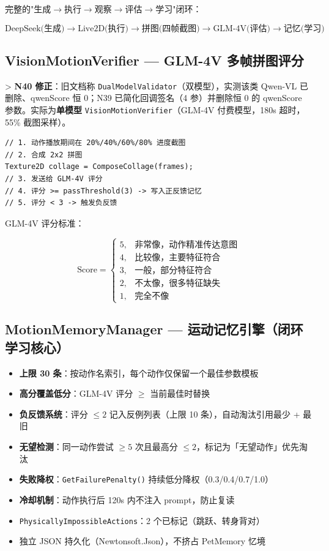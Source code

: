 \documentclass[12pt,a4paper]{ctexart}
\begin{document}
完整的"生成$\rightarrow$执行$\rightarrow$观察$\rightarrow$评估$\rightarrow$学习"闭环：

\[
\text{DeepSeek(生成)} \rightarrow \text{Live2D(执行)} \rightarrow \text{拼图(四帧截图)} \rightarrow \text{GLM-4V(评估)} \rightarrow \text{记忆(学习)}
\]

\subsection{VisionMotionVerifier --- GLM-4V 多帧拼图评分}

> \textbf{N40 修正}：旧文档称 \texttt{DualModelValidator}（双模型），实测该类 Qwen-VL 已删除、qwenScore 恒 0；N39 已简化回调签名（4 参）并删除恒 0 的 qwenScore 参数。实际为\textbf{单模型} \texttt{VisionMotionVerifier}（GLM-4V 付费模型，180s 超时，55\% 截图采样）。

\begin{lstlisting}[style=csharp,caption={多帧拼图验证核心},label={lst:collage}]
// 1. 动作播放期间在 20%/40%/60%/80% 进度截图
// 2. 合成 2x2 拼图
Texture2D collage = ComposeCollage(frames);
// 3. 发送给 GLM-4V 评分
// 4. 评分 >= passThreshold(3) -> 写入正反馈记忆
// 5. 评分 < 3 -> 触发负反馈
\end{lstlisting}

GLM-4V 评分标准：

\[
\text{Score} =
\begin{cases}
5, & \text{非常像，动作精准传达意图} \\
4, & \text{比较像，主要特征符合} \\
3, & \text{一般，部分特征符合} \\
2, & \text{不太像，很多特征缺失} \\
1, & \text{完全不像}
\end{cases}
\]

\subsection{MotionMemoryManager --- 运动记忆引擎（闭环学习核心）}

\begin{itemize}
    \item \textbf{上限 30 条}：按动作名索引，每个动作仅保留一个最佳参数模板
    \item \textbf{高分覆盖低分}：GLM-4V 评分 $\geq$ 当前最佳时替换
    \item \textbf{负反馈系统}：评分 $\leq 2$ 记入反例列表（上限 10 条），自动淘汰引用最少 + 最旧
    \item \textbf{无望检测}：同一动作尝试 $\geq 5$ 次且最高分 $\leq 2$，标记为「无望动作」优先淘汰
    \item \textbf{失败降权}：\texttt{GetFailurePenalty()} 持续低分降权（0.3/0.4/0.7/1.0）
    \item \textbf{冷却机制}：动作执行后 120s 内不注入 prompt，防止复读
    \item \texttt{PhysicallyImpossibleActions}：2 个已标记（跳跃、转身背对）
    \item 独立 JSON 持久化（Newtonsoft.Json），不挤占 PetMemory 忆境
\end{itemize}
\end{document}
